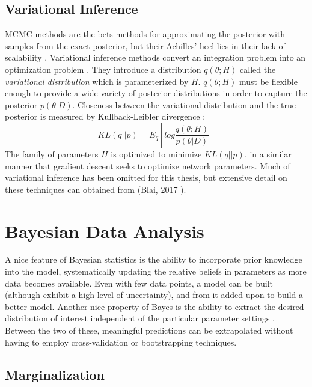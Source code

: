 \subsection{Variational Inference}

MCMC methods are the bets methods for approximating the posterior with samples from the exact posterior, but their Achilles' heel lies in their lack of scalability \cite{Jospin}.  Variational inference methods convert an integration problem into an optimization problem \cite{mullachery2018bayesian}.  They introduce a distribution $q(\theta;H)$ called the \textit{variational distribution} which is parameterized by $H$.  $q(\theta;H)$ must be flexible enough to provide a wide variety of posterior distributions in order to capture the posterior $p(\theta|D)$.  Closeness between the variational distribution and the true posterior is measured by Kullback-Leibler divergence \cite{blei2017variational}:
$$
KL(q||p) = E_q\left[ log\frac{q(\theta;H)}{p(\theta|D)} \right]
$$
The family of parameters $H$ is optimized to minimize $KL(q||p)$, in a similar manner that gradient descent seeks to optimize network parameters.  Much of variational inference has been omitted for this thesis, but extensive detail on these techniques can obtained from (Blai, 2017 \cite{blei2017variational}).


\section{Bayesian Data Analysis} %


A nice feature of Bayesian statistics is the ability to incorporate prior knowledge into the model, systematically updating the relative beliefs in parameters as more data becomes available.  Even with few data points, a model can be built (although exhibit a high level of uncertainty), and from it added upon to build a better model.  Another nice property of Bayes is the ability to extract the desired distribution of interest independent of the particular parameter settings \cite{bishop2006pattern}.  Between the two of these, meaningful predictions can be extrapolated without having to employ cross-validation or bootstrapping techniques.

\subsection{Marginalization}

